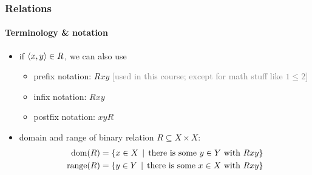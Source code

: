 \documentclass[fleqn,10pt,serif,xcolor=svgnames,xcolor=table,aspectratio=169,handout]{beamer}
\newcommand{\mygray}[1]{\textcolor{gray}{#1}}
\begin{document}
\begin{frame}
  \frametitle{Relations}
  \framesubtitle{Terminology \& notation}

  \begin{itemize}
    \item if $\left \langle x,y\right\rangle \in R$, we can also use
    \begin{itemize}
      \item \textcolor{themecolor}{prefix notation:} $Rxy$ \hfill \mygray{[used in this course; except for math stuff like $1\le2$]}
      \item \textcolor{themecolor}{infix notation:} $Rxy$
      \item \textcolor{themecolor}{postfix notation:} $xyR$
    \end{itemize}
    \item domain and range of binary relation $R \subseteq X \times X$:
          \begin{align*}
            \text{dom}(R) & = \left\{x \in X \thinspace \mid \thinspace \text{there is some $y \in Y$ with } Rxy\right\} \\
            \text{range}(R) & = \left\{y \in Y \thinspace \mid \thinspace \text{there is some $x \in X$ with } Rxy\right\}
          \end{align*}
  \end{itemize}

\end{frame}
\end{document}
